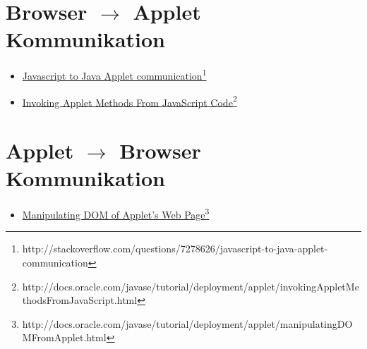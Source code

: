 \documentclass[12pt,a4paper]{article}
\newcommand{\myul}[1]{\ul{#1}}
\newcommand{\jsToAppletComUrlA}{\mbox{http://stackoverflow.com/questions/7278626/javascript-to-java-applet-communication}}
\newcommand{\jsToAppletComUrlB}{\mbox{http://docs.oracle.com/javase/tutorial/deployment/applet/invokingAppletMethodsFromJavaScript.html}}
\newcommand{\appletToDom}{\mbox{http://docs.oracle.com/javase/tutorial/deployment/applet/manipulatingDOMFromApplet.html}}
\begin{document}
\clearpage
\begin{appendix}
\section{Browser $\rightarrow$ Applet Kommunikation}\label{btoacom}
\begin{itemize}
  \item \href{\jsToAppletComUrlA}{\myul{Javascript to Java Applet communication}}\footnote{\jsToAppletComUrlA}
  \item \href{\jsToAppletComUrlB}{\myul{Invoking Applet Methods From JavaScript Code}}\footnote{\jsToAppletComUrlB}
\end{itemize}
\section{Applet $\rightarrow$ Browser Kommunikation}
\begin{itemize}
  \item \href{\appletToDom}{\myul{Manipulating DOM of Applet's Web Page}}\footnote{\appletToDom}
\end{itemize}
\end{appendix}
\end{document}
